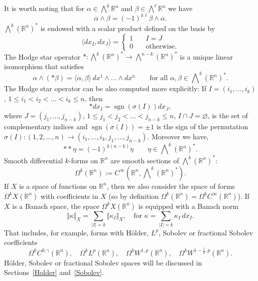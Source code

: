 \documentclass[intlimits,12pt,reqno]{amsart}
\def\sgn{\operatorname{sgn}}
\newcommand{\bbbr}{\mathbb R}
\newcommand{\R}{\mathbb R}
\numberwithin{equation}{section}
\theoremstyle{definition}
\newcommand{\Ep}{\bigwedge\nolimits}
\begin{document}
It is worth noting that for $\alpha \in \Ep^k \R^n$ and $\beta \in \Ep^\ell \R^n$ we have 
$$
 \alpha \wedge \beta = (-1)^{k\ell} \beta \wedge \alpha.
$$
$\Ep^k (\mathbb{R}^n)^\ast$ is endowed with a scalar product defined 
on the basis by
$$
\langle dx_I , dx_J \rangle = \begin{cases}
1 \quad&I=J\\
0 \quad&\text{otherwise.}
\end{cases}
$$
The Hodge star operator $\ast: \Ep^k (\mathbb{R}^n)^\ast \to \Ep^{n-k} (\mathbb{R}^n)^\ast$ is a unique linear isomorphism that satisfies
$$
\alpha \wedge (\ast \beta) = \langle \alpha,\beta\rangle\, dx^1\wedge \ldots \wedge dx^n \qquad \text{for all } \alpha,\beta \in \Ep^k (\mathbb{R}^n)^\ast.
$$
The Hodge star operator can be also computed more explicitly: If $I=(i_1,\ldots,i_k)$, $1 \leq i_1 < i_2 < \ldots < i_k \leq n$, then
\[
 \ast dx_I = \sgn(\sigma(I)) dx_J,
\]
where $J=(j_1,\ldots,j_{n-k})$, $1 \leq j_1 < j_2 < \ldots < j_{n-k} \leq n$, $I \cap J = \varnothing$, 
is the set of complementary indices and $\sgn(\sigma(I))=\pm 1$ is the sign of the permutation
$\sigma(I):(1,2,\ldots,n)\to (i_1,\ldots,i_k,j_1,\ldots,j_{n-k})$.
Moreover we have,
\[
 \ast \ast \eta = (-1)^{k(n-k)} \eta \quad \quad \eta \in \Ep^k (\R^n)^*.
\]
Smooth differential $k$-forms on $\R^{n}$ are smooth sections of $\Ep^k (\R^n)^*$:
$$
\Omega^k(\R^n):=C^\infty\left(\R^n,\Ep^k(\R^n)^*\right).
$$
If $X$ is a space of functions on $\R^n$, then we also consider the space of forms
$\Omega^k X(\R^n)$ with coefficients in $X$ (so by definition $\Omega^k(\R^n)=\Omega^kC^\infty(\R^n)$). If $X$ is a Banach space, the space $\Omega^kX(\bbbr^n)$ is equipped with a Banach norm
$$
\Vert\kappa\Vert_X=\sum_{|I|=k}\Vert \kappa_I\Vert_X,
\quad
\text{for  $\kappa=\sum_{|I|=k}\kappa_I\, dx_I$.}
$$
That includes, for example, forms with  H\"older, $L^p$, Sobolev or fractional Sobolev coefficients
$$
\Omega^k C^{0,\gamma}(\R^n),
\quad
\Omega^k L^p(\R^n),
\quad
\Omega^k W^{1,p}(\R^n),
\quad
\Omega^k W^{1-\frac{1}{p},p}(\R^n).
$$
H\"older, Sobolev or fractional Sobolev spaces will be discussed in Sections~\ref{Holder} and~\ref{Sobolev}.
\end{document}
